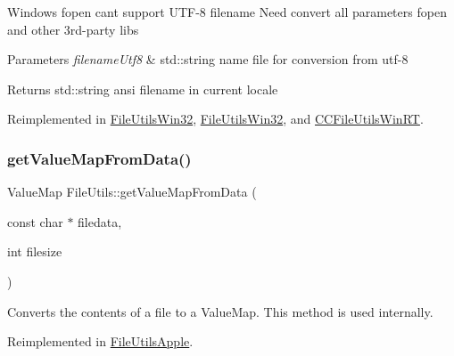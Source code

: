 Windows fopen can\textquotesingle{}t support U\+T\+F-\/8 filename Need convert all parameters fopen and other 3rd-\/party libs


\begin{DoxyParams}{Parameters}
{\em filename\+Utf8} & std\+::string name file for conversion from utf-\/8 \\
\hline
\end{DoxyParams}
\begin{DoxyReturn}{Returns}
std\+::string ansi filename in current locale 
\end{DoxyReturn}


Reimplemented in \hyperlink{classFileUtilsWin32_a4e2aff9afbff7e4bac487f626186dac0}{File\+Utils\+Win32}, \hyperlink{classFileUtilsWin32_a39228d2480a9b1343516bb9f1abe06b1}{File\+Utils\+Win32}, and \hyperlink{classCCFileUtilsWinRT_a655652f655870c93e5fd01259b3eca6b}{C\+C\+File\+Utils\+Win\+RT}.

\mbox{\label{classFileUtils_a3b1cb7c770ba78d1d68c2da204e15a15}} 
\subsubsection{\texorpdfstring{get\+Value\+Map\+From\+Data()}{getValueMapFromData()}\hspace{0.1cm}{\footnotesize\ttfamily [1/2]}}
{\footnotesize\ttfamily Value\+Map File\+Utils\+::get\+Value\+Map\+From\+Data (\begin{DoxyParamCaption}\item[{const char $\ast$}]{filedata,  }\item[{int}]{filesize }\end{DoxyParamCaption})\hspace{0.3cm}{\ttfamily [virtual]}}

Converts the contents of a file to a Value\+Map. This method is used internally. 

Reimplemented in \hyperlink{classFileUtilsApple_aa692d9cc3bb1a5b913fd5ce5dee0a548}{File\+Utils\+Apple}.

\mbox{\label{classFileUtils_a9c882af1acde6d249e35713e82b53607}} 
